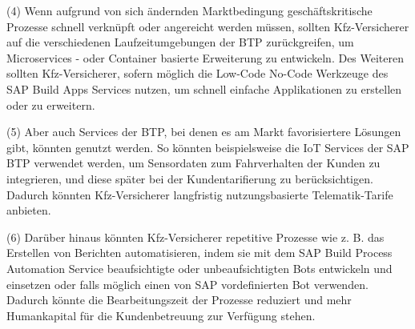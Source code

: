 (4) Wenn aufgrund von sich ändernden Marktbedingung geschäftskritische Prozesse schnell verknüpft oder angereicht werden müssen, sollten Kfz-Versicherer auf die verschiedenen Laufzeitumgebungen der BTP zurückgreifen, um Microservices - oder Container basierte Erweiterung zu entwickeln. Des Weiteren sollten Kfz-Versicherer, sofern möglich die Low-Code No-Code Werkzeuge des SAP Build Apps Services nutzen, um schnell einfache Applikationen zu erstellen oder zu erweitern. 

(5) Aber auch Services der BTP, bei denen es am Markt favorisiertere Lösungen gibt, könnten genutzt werden. So könnten beispielsweise die IoT Services der SAP BTP verwendet werden, um Sensordaten zum Fahrverhalten der Kunden zu integrieren, und diese später bei der Kundentarifierung zu berücksichtigen. Dadurch könnten Kfz-Versicherer langfristig nutzungsbasierte Telematik-Tarife anbieten.

(6) Darüber hinaus könnten Kfz-Versicherer repetitive Prozesse wie z. B. das Erstellen von Berichten automatisieren, indem sie mit dem SAP Build Process Automation Service beaufsichtigte oder unbeaufsichtigten Bots entwickeln und einsetzen oder falls möglich einen von SAP vordefinierten Bot verwenden. Dadurch könnte die Bearbeitungszeit der Prozesse reduziert und mehr Humankapital für die Kundenbetreuung zur Verfügung stehen.


